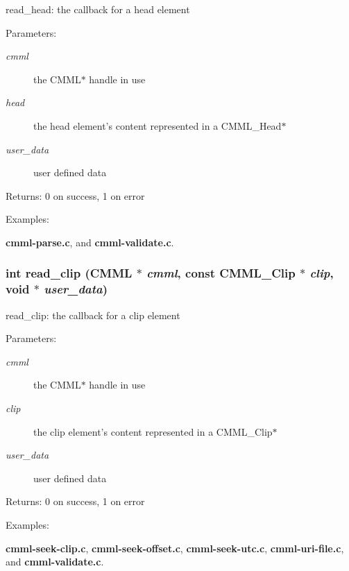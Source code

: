 read\_\-head: the callback for a head element

\begin{Desc}
\item[Parameters:]
\begin{description}
\item[{\em cmml}]the CMML$\ast$ handle in use \item[{\em head}]the head element's content represented in a CMML\_\-Head$\ast$ \item[{\em user\_\-data}]user defined data\end{description}
\end{Desc}
\begin{Desc}
\item[Returns:]0 on success, 1 on error \end{Desc}
\begin{Desc}
\item[Examples: ]\par
{\bf cmml-parse.c}, and {\bf cmml-validate.c}.\end{Desc}
\subsubsection{\setlength{\rightskip}{0pt plus 5cm}int read\_\-clip ({\bf CMML} $\ast$ {\em cmml}, const {\bf CMML\_\-Clip} $\ast$ {\em clip}, void $\ast$ {\em user\_\-data})\hspace{0.3cm}{\tt  [static]}}\label{cmml-validate_8c_a5}


read\_\-clip: the callback for a clip element

\begin{Desc}
\item[Parameters:]
\begin{description}
\item[{\em cmml}]the CMML$\ast$ handle in use \item[{\em clip}]the clip element's content represented in a CMML\_\-Clip$\ast$ \item[{\em user\_\-data}]user defined data\end{description}
\end{Desc}
\begin{Desc}
\item[Returns:]0 on success, 1 on error \end{Desc}
\begin{Desc}
\item[Examples: ]\par
{\bf cmml-seek-clip.c}, {\bf cmml-seek-offset.c}, {\bf cmml-seek-utc.c}, {\bf cmml-uri-file.c}, and {\bf cmml-validate.c}.\end{Desc}
